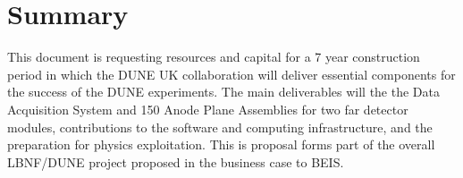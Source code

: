 \section*{Summary}
This document is requesting resources and capital for a 7 year construction period in which the DUNE UK collaboration will deliver essential components for the success of the DUNE experiments. The main deliverables will the the Data Acquisition System and 150 Anode Plane Assemblies for two far detector modules, contributions to the software and computing infrastructure, and the preparation for physics exploitation. This is proposal forms part of the overall LBNF/DUNE project proposed in the business case to BEIS.

\thispagestyle{empty}

\newpage
\thispagestyle{empty}
\setcounter{page}{1}

\setcounter{tocdepth}{2}
\tableofcontents